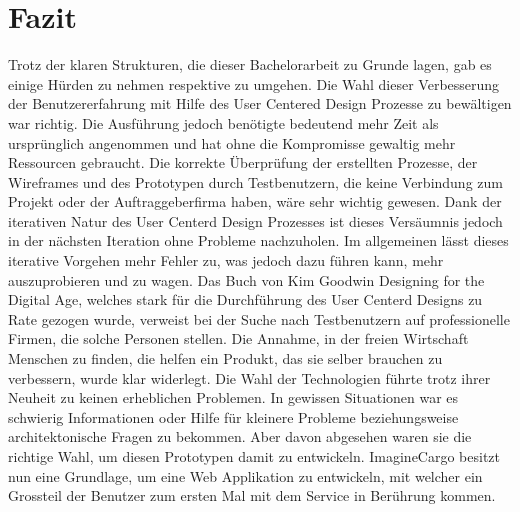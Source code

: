 \chapter{Fazit}
\label{sec:fazit}
Trotz der klaren Strukturen, die dieser Bachelorarbeit zu Grunde lagen, gab es einige Hürden zu nehmen respektive zu umgehen. Die Wahl dieser Verbesserung der Benutzererfahrung mit Hilfe des User Centered Design Prozesse zu bewältigen war richtig. Die Ausführung jedoch benötigte bedeutend mehr Zeit als ursprünglich angenommen und hat ohne die Kompromisse gewaltig mehr Ressourcen gebraucht. Die korrekte Überprüfung der erstellten Prozesse, der Wireframes und des Prototypen durch Testbenutzern, die keine Verbindung zum Projekt oder der Auftraggeberfirma haben, wäre sehr wichtig gewesen. Dank der iterativen Natur des User Centerd Design Prozesses ist dieses Versäumnis jedoch in der nächsten Iteration ohne Probleme nachzuholen. Im allgemeinen lässt dieses iterative Vorgehen mehr Fehler zu, was jedoch dazu führen kann, mehr auszuprobieren und zu wagen. Das Buch von Kim Goodwin \glqq{}Designing for the Digital Age\grqq{},  welches stark für die Durchführung des User Centerd Designs zu Rate gezogen wurde, verweist bei der Suche nach Testbenutzern auf professionelle Firmen, die solche Personen stellen. Die Annahme, in der freien Wirtschaft Menschen zu finden, die helfen ein Produkt, das sie selber brauchen zu verbessern, wurde klar widerlegt. Die Wahl der Technologien führte trotz ihrer Neuheit zu keinen erheblichen Problemen. In gewissen Situationen war es schwierig Informationen oder Hilfe für kleinere Probleme beziehungsweise architektonische Fragen zu bekommen. Aber davon abgesehen waren sie die richtige Wahl, um diesen Prototypen damit zu entwickeln. ImagineCargo besitzt nun eine Grundlage, um eine Web Applikation zu entwickeln, mit welcher ein Grossteil der Benutzer zum ersten Mal mit dem Service in Berührung kommen.

